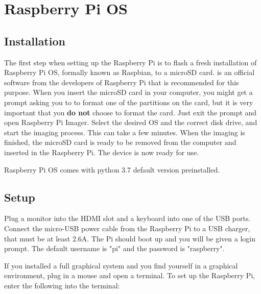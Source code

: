 %
%
%




\chapter{Raspberry Pi OS}

\section{Installation}
The first step when setting up the Raspberry Pi is to flash a fresh installation of Raspberry Pi OS, formally known as Raspbian, to a microSD card. \href{https://www.raspberrypi.org/software/}{\color{blue}{Raspberry Pi Imager}} is an official software from the developers of Raspberry Pi that is recommended for this purpose. When you insert the microSD card in your computer, you might get a prompt asking you to to format one of the partitions on the card, but it is very important that you \textbf{do not} choose to format the card. Just exit the prompt and open Raspberry Pi Imager. Select the desired OS and the correct disk drive, and start the imaging process. This can take a few minutes. When the imaging is finished, the microSD card is ready to be removed from the computer and inserted in the Raspberry Pi. The device is now ready for use.

\begin{notes}
	\item Raspberry Pi OS comes with python 3.7 default version preinstalled.
\end{notes}


\section{Setup}
Plug a monitor into the HDMI slot and a keyboard into one of the USB ports. Connect the micro-USB power cable from the Raspberry Pi to a USB charger, that must be at least 2.6A. The Pi should boot up and you will be given a login prompt. The default username is "pi" and the password is "raspberry".

If you installed a full graphical system and you find yourself in a graphical environment, plug in a mouse and open a terminal.
To set up the Raspberry Pi, enter the following into the terminal:

